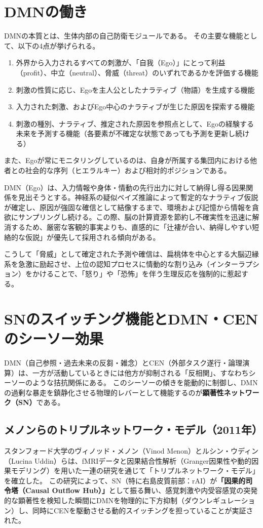 \section{DMNの働き}
\label{section:DMNの働き}
DMNの本質とは、生体内部の自己防衛モジュールである。
その主要な機能として、以下の4点が挙げられる。
\begin{enumerate}
    \item 外界から入力されるすべての刺激が、「自我（Ego）」にとって利益（profit）、中立（neutral）、脅威（threat）のいずれであるかを評価する機能
    \item 刺激の性質に応じ、Egoを主人公としたナラティブ（物語）を生成する機能
    \item 入力された刺激、およびEgo中心のナラティブが生じた原因を探索する機能
    \item 刺激の種別、ナラティブ、推定された原因を参照点として、Egoの経験する未来を予測する機能（各要素が不確定な状態であっても予測を更新し続ける）
\end{enumerate}

また、Egoが常にモニタリングしているのは、自身が所属する集団内における他者との社会的な序列（ヒエラルキー）および相対的ポジションである。

DMN（Ego）は、入力情報や身体・情動の先行出力に対して納得し得る因果関係を見出そうとする。神経系の疑似ベイズ推論によって暫定的なナラティブ仮説が確定し、原因が強固な確信として結像するまで、環境および記憶から情報を貪欲にサンプリングし続ける。この際、脳の計算資源を節約し不確実性を迅速に解消するため、厳密な客観的事実よりも、直感的に「辻褄が合い、納得しやすい短絡的な仮説」が優先して採用される傾向がある。

こうして「脅威」として確定された予測や確信は、扁桃体を中心とする大脳辺縁系を急激に励起させ、上位の認知プロセスに情動的な割り込み（インターラプション）をかけることで、「怒り」や「恐怖」を伴う生理反応を強制的に惹起する。

\section{SNのスイッチング機能とDMN・CENのシーソー効果}

DMN（自己参照・過去未来の反芻・雑念）とCEN（外部タスク遂行・論理演算）は、一方が活動しているときには他方が抑制される「反相関」、すなわちシーソーのような拮抗関係にある。
このシーソーの傾きを能動的に制御し、DMNの過剰な暴走を鎮静化させる物理的レバーとして機能するのが\textbf{顕著性ネットワーク（SN）}である。

\subsection{メノンらのトリプルネットワーク・モデル（2011年）}
スタンフォード大学のヴィノッド・メノン（Vinod Menon）とルシン・ウディン（Lucina Uddin）らは、fMRIデータと因果結合性解析（Granger因果性や動的因果モデリング）を用いた一連の研究を通じて「トリプルネットワーク・モデル」を確立した。
この研究によって、SN（特に右島皮質前部：rAI）が\textbf{「因果的司令塔（Causal Outflow Hub）」}として振る舞い、感覚刺激や内受容感覚の突発的な顕著性を検知した瞬間にDMNを物理的に下方抑制（ダウンレギュレーション）し、同時にCENを駆動させる動的スイッチングを担っていることが実証された。


